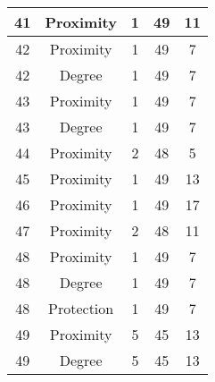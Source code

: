 \documentclass[results.tex]{subfiles}
\begin{document}
\begin{center}
\begin{tabular}{| c || c | c | c | c |}
            \hline
            41                      & Proximity                    & 1                      & 49                      & 11                   \\
            \hline
            42                      & Proximity                    & 1                      & 49                      & 7                    \\
            \hline
            42                      & Degree                       & 1                      & 49                      & 7                    \\
            \hline
            43                      & Proximity                    & 1                      & 49                      & 7                    \\
            \hline
            43                      & Degree                       & 1                      & 49                      & 7                    \\
            \hline
            44                      & Proximity                    & 2                      & 48                      & 5                    \\
            \hline
            45                      & Proximity                    & 1                      & 49                      & 13                   \\
            \hline
            46                      & Proximity                    & 1                      & 49                      & 17                   \\
            \hline
            47                      & Proximity                    & 2                      & 48                      & 11                   \\
            \hline
            48                      & Proximity                    & 1                      & 49                      & 7                    \\
            \hline
            48                      & Degree                       & 1                      & 49                      & 7                    \\
            \hline
            48                      & Protection                   & 1                      & 49                      & 7                    \\
            \hline
            49                      & Proximity                    & 5                      & 45                      & 13                   \\
            \hline
            49                      & Degree                       & 5                      & 45                      & 13                   \\
            \hline
        \end{tabular}
    \end{center}
\end{document}

